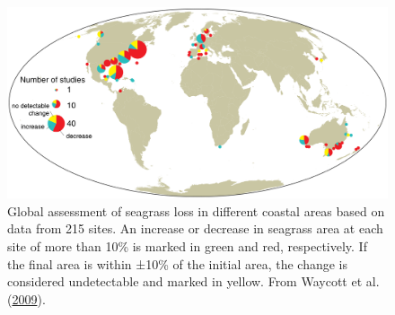 \documentclass[
  12 pt,
]{book}
\begin{document}
\begin{figure}

{\centering \includegraphics[width=0.9\linewidth]{figures/waycott2009} 

}

\caption{Global assessment of seagrass loss in different coastal areas based on data from 215 sites. An increase or decrease in seagrass area at each site of more than 10\si{\percent} is marked in green and red, respectively. If the final area is within ±10\si{\percent} of the initial area, the change is considered undetectable and marked in yellow. From Waycott et al. (\protect\hyperlink{ref-Waycott2009}{2009}).}\label{fig:waycott2009}
\end{figure}
\end{document}
